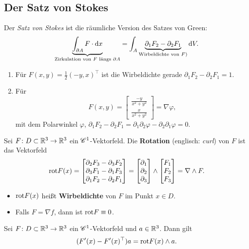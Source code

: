 \subsection{Der Satz von Stokes}
Der \textit{Satz von Stokes} ist die räumliche Version des Satzes von Green:
\[\underbrace{\int_{\partial A} F \cdot \mathrm{d} x}_{\text{Zirkulation von $F$ längs $\partial A$}} = \int_A \underbrace{\partial_1 F_2 - \partial_2 F_1}_{\text{Wirbeldichte von $F$})} \mathrm{d} V.\]
\begin{beispiel}
	\begin{enumerate}[label=(\arabic*)]
		\item Für $F(x,y) = \frac{1}{2} (-y, x)^\top$ ist die Wirbeldichte gerade $\partial_1 F_2 - \partial_2 F_1 = 1$.
		\item Für
		\[F(x,y) = \begin{bmatrix}
			\frac{-y}{x^2 + y^2}\\
			\frac{x}{x^2 + y^2}
		\end{bmatrix} = \nabla \varphi,\]
		mit dem Polarwinkel $\varphi$, $\partial_1 F_2 - \partial_2 F_1 = \partial_1 \partial_2 \varphi - \partial_2 \partial_1 \varphi = 0$. 
	\end{enumerate}
\end{beispiel}
Sei $F \colon D \subset \mathbb{R}^3 \to \mathbb{R}^3$ ein $\mathscr{C}^1$-Vektorfeld. Die \textbf{Rotation} (englisch: \textit{curl}) von $F$ ist das Vektorfeld
\[\mathrm{rot} F (x) = \begin{bmatrix}
	\partial_2 F_3 - \partial_3 F_2\\
	\partial_3 F_1 - \partial_1 F_3\\
	\partial_1 F_2 - \partial_2 F_1
\end{bmatrix} = \begin{bmatrix}
\partial_1\\\partial_2\\\partial_3
\end{bmatrix} \wedge \begin{bmatrix}
F_1\\F_2\\F_3
\end{bmatrix} = \nabla \wedge F.\]
\begin{itemize}
	\item $\mathrm{rot} F(x)$ heißt \textbf{Wirbeldichte} von $F$ im Punkt $x \in D$.
	\item Falls $F = \nabla f$, dann ist $\mathrm{rot} F \equiv 0$.
\end{itemize} 
\begin{lem}\label{lem3_24}
	Sei $F \colon D \subset \mathbb{R}^3 \to \mathbb{R}^3$ ein $\mathscr{C}^1$-Vektorfeld und $a \in \mathbb{R}^3$. Dann gilt
	\[(F'(x) - F'(x)^\top)a = \mathrm{rot} F(x) \wedge a.\]
\end{lem}
